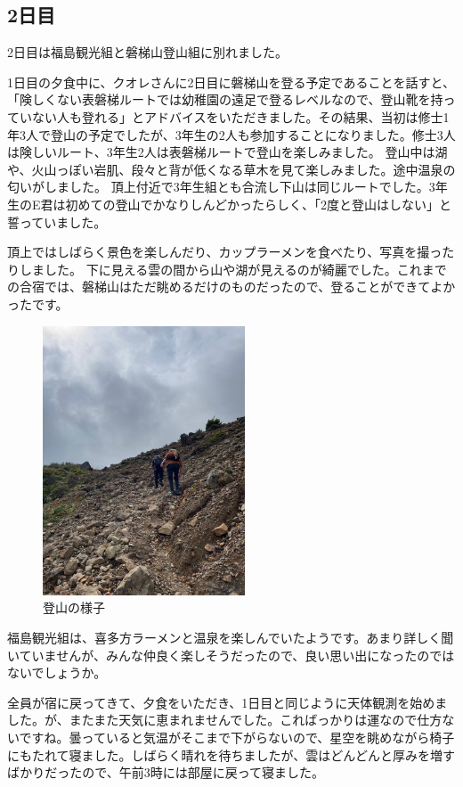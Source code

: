\documentclass[../main]{subfiles}
\begin{document}
\subsection{2日目}
2日目は福島観光組と磐梯山登山組に別れました。

1日目の夕食中に、クオレさんに2日目に磐梯山を登る予定であることを話すと、「険しくない表磐梯ルートでは幼稚園の遠足で登るレベルなので、登山靴を持っていない人も登れる」とアドバイスをいただきました。その結果、当初は修士1年3人で登山の予定でしたが、3年生の2人も参加することになりました。修士3人は険しいルート、3年生2人は表磐梯ルートで登山を楽しみました。
登山中は湖や、火山っぽい岩肌、段々と背が低くなる草木を見て楽しみました。途中温泉の匂いがしました。
頂上付近で3年生組とも合流し下山は同じルートでした。3年生のE君は初めての登山でかなりしんどかったらしく、「2度と登山はしない」と誓っていました。

頂上ではしばらく景色を楽しんだり、カップラーメンを食べたり、写真を撮ったりしました。
下に見える雲の間から山や湖が見えるのが綺麗でした。これまでの合宿では、磐梯山はただ眺めるだけのものだったので、登ることができてよかったです。
\begin{figure}[H]
\centering
\includegraphics[width=6cm]{sections/Nakahara/IMG_8389.jpg}
\caption{登山の様子}
\centering
\end{figure}

福島観光組は、喜多方ラーメンと温泉を楽しんでいたようです。あまり詳しく聞いていませんが、みんな仲良く楽しそうだったので、良い思い出になったのではないでしょうか。

全員が宿に戻ってきて、夕食をいただき、1日目と同じように天体観測を始めました。が、またまた天気に恵まれませんでした。こればっかりは運なので仕方ないですね。曇っていると気温がそこまで下がらないので、星空を眺めながら椅子にもたれて寝ました。しばらく晴れを待ちましたが、雲はどんどんと厚みを増すばかりだったので、午前3時には部屋に戻って寝ました。
\end{document}
